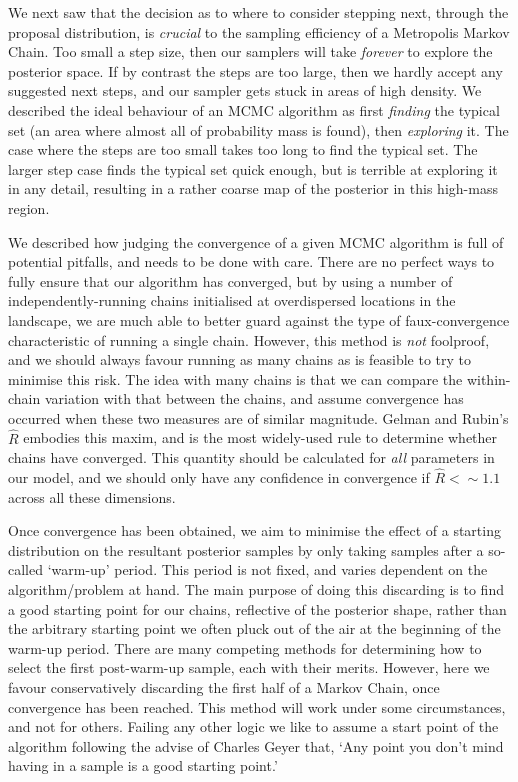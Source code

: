 \documentclass[11pt,fullpage]{book}
\begin{document}
We next saw that the decision as to where to consider stepping next, through the proposal distribution, is \textit{crucial} to the sampling efficiency of a Metropolis Markov Chain. Too small a step size, then our samplers will take \textit{forever} to explore the posterior space. If by contrast the steps are too large, then we hardly accept any suggested next steps, and our sampler gets stuck in areas of high density. We described the ideal behaviour of an MCMC algorithm as first \textit{finding} the typical set (an area where almost all of probability mass is found), then \textit{exploring} it. The case where the steps are too small takes too long to find the typical set. The larger step case finds the typical set quick enough, but is terrible at exploring it in any detail, resulting in a rather coarse map of the posterior in this high-mass region.

We described how judging the convergence of a given MCMC algorithm is full of potential pitfalls, and needs to be done with care. There are no perfect ways to fully ensure that our algorithm has converged, but by using a number of independently-running chains initialised at overdispersed locations in the landscape, we are much able to better guard against the type of faux-convergence characteristic of running a single chain. However, this method is \textit{not} foolproof, and we should always favour running as many chains as is feasible to try to minimise this risk. The idea with many chains is that we can compare the within-chain variation with that between the chains, and assume convergence has occurred when these two measures are of similar magnitude. Gelman and Rubin's $\hat{R}$ embodies this maxim, and is the most widely-used rule to determine whether chains have converged. This quantity should be calculated for \textit{all} parameters in our model, and we should only have any confidence in convergence if $\hat{R}<\sim 1.1$ across all these dimensions. 

Once convergence has been obtained, we aim to minimise the effect of a starting distribution on the resultant posterior samples by only taking samples after a so-called `warm-up' period. This period is not fixed, and varies dependent on the algorithm/problem at hand. The main purpose of doing this discarding is to find a good starting point for our chains, reflective of the posterior shape, rather than the arbitrary starting point we often pluck out of the air at the beginning of the warm-up period. There are many competing methods for determining how to select the first post-warm-up sample, each with their merits. However, here we favour conservatively discarding the first half of a Markov Chain, once convergence has been reached. This method will work under some circumstances, and not for others. Failing any other logic we like to assume a start point of the algorithm following the advise of Charles Geyer \cite{brooks2011handbook} that, `Any point you don't mind having in a sample is a good starting point.'
\end{document}

